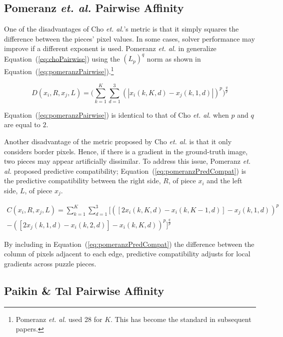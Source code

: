 \documentclass{report}
\def\eref#1{(\ref{#1})}
\begin{document}
\subsection{Pomeranz \textit{et. al.} Pairwise Affinity}\label{sec:pomeranzPairwiseAffinity}

One of the disadvantages of Cho \textit{et. al.}'s metric is that it simply squares the difference between the pieces' pixel values.  In some cases, solver performance may improve if a different exponent is used.  Pomeranz \textit{et. al.} in \cite{pomeranz2011} generalize Equation~\eref{eq:choPairwise} using the $(L_{p})^{q}$ norm as shown in Equation~\eref{eq:pomeranzPairwise}.\footnote{Pomeranz \textit{et. al.} used 28 for $K$.  This has become the standard in subsequent papers.}

\begin{equation} \label{eq:pomeranzPairwise}
D(x_i,R,x_j,L) = \bigg(\sum_{k=1}^{K}\sum_{d=1}^{3}(|x_i(k,K,d) - x_j(k,1,d)|)^p\bigg)^{\frac{q}{p}}
\end{equation}

\noindent
Equation~\eref{eq:pomeranzPairwise} is identical to that of Cho \textit{et. al.} when $p$ and $q$ are equal to $2$.

Another disadvantage of the metric proposed by Cho \textit{et. al.} is that it only considers border pixels.  Hence, if there is a gradient in the ground-truth image, two pieces may appear artificially dissimilar.  To address this issue, Pomeranz \textit{et. al.} proposed predictive compatibility; Equation~\eref{eq:pomeranzPredCompat} is the predictive compatibility between the right side, $R$, of piece $x_i$ and the left side, $L$, of piece $x_j$.  

\begin{equation} \label{eq:pomeranzPredCompat}
\begin{split}
C(x_i,R,x_j,L) = \sum_{k=1}^{K}\sum_{d=1}^{3}\Big[ ([2x_i(k, K, d) - x_i(k, K-1, d)] - x_j(k, 1, d))^p \\ - ([2x_j(k, 1, d) - x_i(k, 2, d)] - x_i(k, K, d))^p\Big]^{\frac{q}{p}}
\end{split}
\end{equation}

By including in Equation~\eref{eq:pomeranzPredCompat} the difference between the column of pixels adjacent to each edge, predictive compatibility adjusts for local gradients across puzzle pieces.

\subsection{Paikin \& Tal Pairwise Affinity}\label{sec:paikinPairwiseAffinity}
\end{document}
